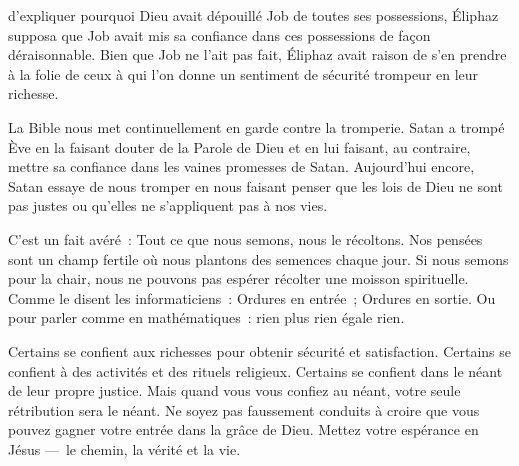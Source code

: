 \dvrule






 d'expliquer pourquoi Dieu avait dépouillé Job
 de toutes ses possessions, Éliphaz supposa que Job avait mis sa confiance
 dans ces possessions de façon déraisonnable.
 Bien que Job ne l'ait pas fait, Éliphaz avait raison de s'en prendre
 à la folie de ceux à qui l'on donne un sentiment de sécurité trompeur
 en leur richesse. 

La Bible nous met continuellement en garde contre la tromperie.
 Satan a trompé Ève en la faisant douter de la Parole de Dieu
 et en lui faisant, au contraire, mettre sa confiance dans les vaines
 promesses de Satan.
 Aujourd'hui encore, Satan essaye de nous tromper en nous faisant penser
 que les lois de Dieu ne sont pas justes ou qu'elles ne s'appliquent
 pas à nos vies. 


C'est un fait avéré~: Tout ce que nous semons, nous le récoltons.
 Nos pensées sont un champ fertile où nous plantons des semences chaque jour.
 Si nous semons pour la chair, nous ne pouvons pas espérer récolter
 une moisson spirituelle.
 Comme le disent les informaticiens~:
 \og Ordures en entrée~; Ordures en sortie. \fg{}
 Ou pour parler comme en mathématiques~: rien plus rien égale rien. 

Certains se confient aux richesses pour obtenir sécurité et satisfaction.
 Certains se confient à des activités et des rituels religieux.
 Certains se confient dans le néant de leur propre justice.
 Mais quand vous vous confiez au néant, votre seule rétribution sera le néant.
 Ne soyez pas faussement conduits à croire que vous pouvez gagner
 votre entrée dans la grâce de Dieu.
 Mettez votre espérance en Jésus ---~le chemin, la vérité et la vie.

\dvrule



